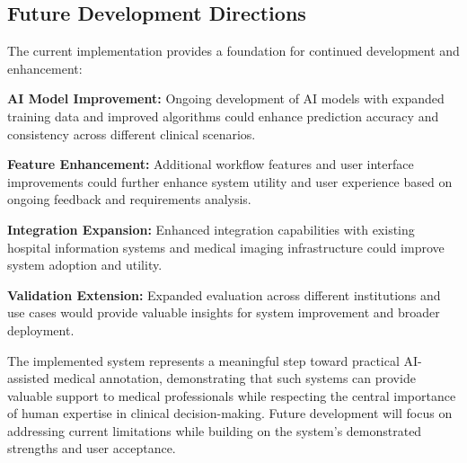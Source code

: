 \subsection{Future Development Directions}

The current implementation provides a foundation for continued development and enhancement:

\textbf{AI Model Improvement:} Ongoing development of AI models with expanded training data and improved algorithms could enhance prediction accuracy and consistency across different clinical scenarios.

\textbf{Feature Enhancement:} Additional workflow features and user interface improvements could further enhance system utility and user experience based on ongoing feedback and requirements analysis.

\textbf{Integration Expansion:} Enhanced integration capabilities with existing hospital information systems and medical imaging infrastructure could improve system adoption and utility.

\textbf{Validation Extension:} Expanded evaluation across different institutions and use cases would provide valuable insights for system improvement and broader deployment.

The implemented system represents a meaningful step toward practical AI-assisted medical annotation, demonstrating that such systems can provide valuable support to medical professionals while respecting the central importance of human expertise in clinical decision-making. Future development will focus on addressing current limitations while building on the system's demonstrated strengths and user acceptance. 